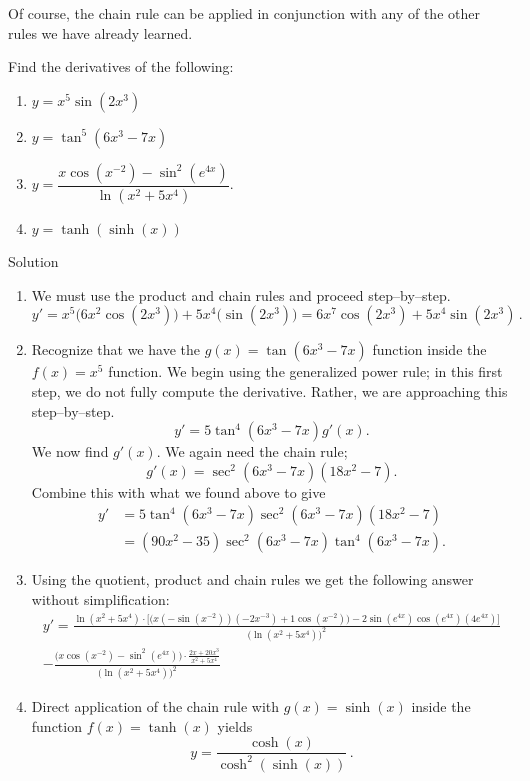 Of course, the chain rule can be applied in conjunction with any of the other rules we have already learned.
\fi

\begin{example}\label{ex_chain4}
Find the derivatives of the following: 
\begin{multicols}{2}
\begin{enumerate}
\item $y = x^5 \sin{(2x^3)}$
\item $y = \tan^5(6x^3-7x)$ 
\item $y = \dfrac{x\cos(x^{-2})-\sin^2(e^{4x})}{\ln(x^2+5x^4)}.$
\ifcourse
\ifanalysis\item $y=\tanh\left(\sinh(x)\right)$ \fi \fi
\end{enumerate}
\end{multicols}

Solution 

\begin{enumerate}
\item		We must use the product and chain rules and proceed step--by--step.
		$$y' = x^5\big(6x^2\cos (2x^3)\big) + 5x^4\big(\sin (2x^3)\big)= 6x^7\cos(2x^3)+5x^4\sin(2x^3)\,.$$
\item Recognize that we have the $g(x)=\tan(6x^3-7x)$ function inside the $f(x)=x^5$ function. We begin using the generalized power rule; in this first step, we do not fully compute the derivative. Rather, we are approaching this step--by--step.
$$y' = 5\tan^4(6x^3-7x) g'(x).$$
We now find $g'(x)$. We again need the chain rule; $$g'(x) = \sec^2(6x^3-7x)(18x^2-7).$$ Combine this with what we found above to give
\begin{align*}
y' &= 5\tan^4(6x^3-7x)\sec^2(6x^3-7x)(18x^2-7)\\ 
&= (90x^2-35)\sec^2(6x^3-7x)\tan^4(6x^3-7x).
\end{align*}
\item Using the quotient, product and chain rules we get the following answer without simplification:
\begin{multline*}
y'=\frac{\ln(x^2+5x^4)\cdot\Big[\big(x(-\sin(x^{-2}))(-2x^{-3})+1 \cos(x^{-2})\big)-2\sin(e^{4x})\cos(e^{4x})(4e^{4x})\Big]}{\big(\ln(x^2+5x^4)\big)^2}\\[0.2cm]
-\frac{\Big(x\cos(x^{-2})-\sin^2(e^{4x})\Big)\cdot\frac{2x+20x^3}{x^2+5x^4}}{\big(\ln(x^2+5x^4)\big)^2}
\end{multline*}
\ifcourse
\ifanalysis\item Direct application of the chain rule with $g(x)=\sinh(x)$ inside the function $f(x)=\tanh(x)$ yields
$$ y=\dfrac{\cosh(x)}{\cosh^2\left(\sinh(x)\right)}\,.
$$
\fi \fi

\end{enumerate}
\end{example}

